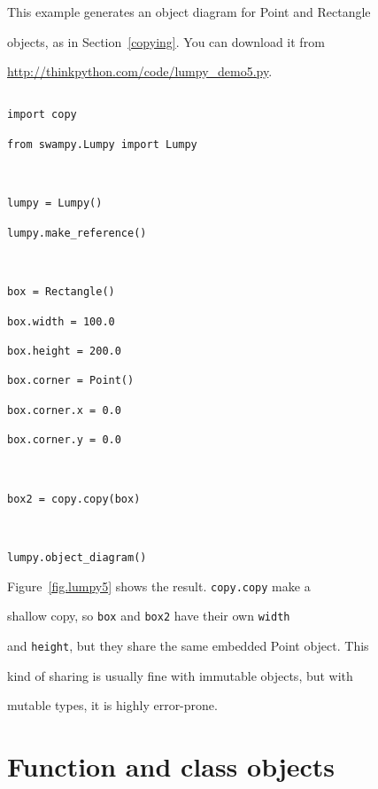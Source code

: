 This example generates an object diagram for Point and Rectangle

objects, as in Section~\ref{copying}.  You can download it from

\url{http://thinkpython.com/code/lumpy_demo5.py}.







\begin{verbatim}

import copy

from swampy.Lumpy import Lumpy



lumpy = Lumpy()

lumpy.make_reference()



box = Rectangle()

box.width = 100.0

box.height = 200.0

box.corner = Point()

box.corner.x = 0.0

box.corner.y = 0.0



box2 = copy.copy(box)



lumpy.object_diagram()

\end{verbatim}



Figure~\ref{fig.lumpy5} shows the result.  {\tt copy.copy} make a

shallow copy, so {\tt box} and {\tt box2} have their own {\tt width}

and {\tt height}, but they share the same embedded Point object.  This

kind of sharing is usually fine with immutable objects, but with

mutable types, it is highly error-prone.





\section{Function and class objects}



